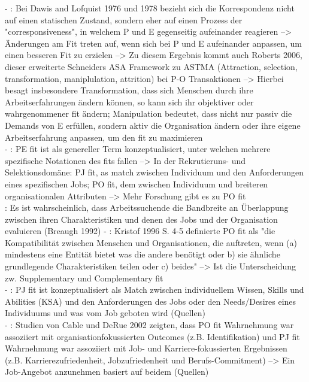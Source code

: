 - \cite[S. 11f.]{su:2015}: Bei Dawis and Lofquist 1976 und 1978 bezieht sich die Korrespondenz nicht auf einen statischen Zustand, sondern eher auf einen Prozess der "corresponsiveness", in welchem P und E gegenseitig aufeinander reagieren --> Änderungen am Fit treten auf, wenn sich bei P und E aufeinander anpassen, um einen besseren Fit zu erzielen --> Zu diesem Ergebnis kommt auch Roberts 2006, dieser erweiterte Schneiders ASA Framework zu ASTMA (Attraction, selection, transformation, maniplulation, attrition) bei P-O Transaktionen --> Hierbei besagt insbesondere Transformation, dass sich Menschen durch ihre Arbeitserfahrungen ändern können, so kann sich ihr objektiver oder wahrgenommener fit ändern; Manipulation bedeutet, dass nicht nur passiv die Demands von E erfüllen, sondern aktiv die Organisation ändern oder ihre eigene Arbeitserfahrung anpassen, um den fit zu maximieren \\
- \cite[S. 1f.]{carless:2005}: PE fit ist als genereller Term konzeptualisiert, unter welchen mehrere spezifische Notationen des fits fallen --> In der Rekrutieruns- und Selektionsdomäne: PJ fit, as match zwischen Individuum und den Anforderungen eines spezifischen Jobs; PO fit, dem zwischen Individuum und breiteren organisationalen Attributen --> Mehr Forschung gibt es zu PO fit \\
\cite[S. 2]{carless:2005}: Es ist wahrscheinlich, dass Arbeitssuchende die Bandbreite an Überlappung zwischen ihren Charakteristiken und denen des Jobs und der Organisation evaluieren (Breaugh 1992)
- \cite[S. 2]{carless:2005}: Kristof 1996 S. 4-5 definierte PO fit als "die Kompatibilität zwischen Menschen und Organisationen, die auftreten, wenn (a) mindestens eine Entität bietet was die andere benötigt oder b) sie ähnliche grundlegende Charakteristiken teilen oder c) beides" --> Ist die Unterscheidung zw. Supplementary und Complementary fit \\
- \cite[S. 2]{carless:2005}: PJ fit ist konzeptualisiert als Match zwischen individuellem Wissen, Skills und Abilities (KSA) und den Anforderungen des Jobs oder den Needs/Desires eines Individuums und was vom Job geboten wird (Quellen) \\
- \cite[S. 3]{carless:2005}: Studien von Cable und DeRue 2002 zeigten, dass PO fit Wahrnehmung war assoziiert mit organisationfokussierten Outcomes (z.B. Identifikation) und PJ fit Wahrnehmung war assoziiert mit Job- und Karriere-fokussierten Ergebnissen (z.B. Karrierezufriedenheit, Jobzufriedenheit und Berufs-Commitment) --> Ein Job-Angebot anzunehmen basiert auf beidem (Quellen)

